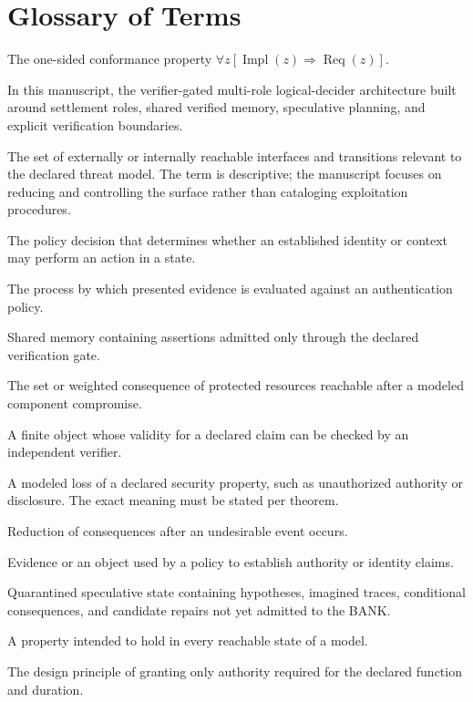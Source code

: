\documentclass[11pt,oneside]{book}
\theoremstyle{definition}
\theoremstyle{remark}
\newcommand{\Impl}{\operatorname{Impl}}
\newcommand{\Req}{\operatorname{Req}}
\begin{document}
\chapter{Glossary of Terms}
\label{app:term-glossary}
\begin{description}[style=nextline,leftmargin=2.4em]
\item[Acceptance-soundness] The one-sided conformance property $\forall z[\Impl(z)\Rightarrow\Req(z)]$.
\item[AMLD] In this manuscript, the verifier-gated multi-role logical-decider architecture built around settlement roles, shared verified memory, speculative planning, and explicit verification boundaries.
\item[Attack surface] The set of externally or internally reachable interfaces and transitions relevant to the declared threat model. The term is descriptive; the manuscript focuses on reducing and controlling the surface rather than cataloging exploitation procedures.
\item[Authorization] The policy decision that determines whether an established identity or context may perform an action in a state.
\item[Authentication] The process by which presented evidence is evaluated against an authentication policy.
\item[BANK] Shared memory containing assertions admitted only through the declared verification gate.
\item[Blast radius] The set or weighted consequence of protected resources reachable after a modeled component compromise.
\item[Certificate] A finite object whose validity for a declared claim can be checked by an independent verifier.
\item[Compromise] A modeled loss of a declared security property, such as unauthorized authority or disclosure. The exact meaning must be stated per theorem.
\item[Containment] Reduction of consequences after an undesirable event occurs.
\item[Credential] Evidence or an object used by a policy to establish authority or identity claims.
\item[FUTUREBANK] Quarantined speculative state containing hypotheses, imagined traces, conditional consequences, and candidate repairs not yet admitted to the BANK.
\item[Invariant] A property intended to hold in every reachable state of a model.
\item[Least privilege] The design principle of granting only authority required for the declared function and duration.

\end{description}
\end{document}
